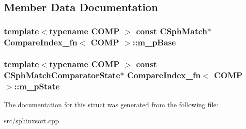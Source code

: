 \subsection{Member Data Documentation}
\hypertarget{structCompareIndex__fn_ac1ea399af8852b8bb036803a2cdeb092}{
\subsubsection[{m\-\_\-p\-Base}]{\setlength{\rightskip}{0pt plus 5cm}template$<$typename C\-O\-M\-P $>$ const {\bf C\-Sph\-Match}$\ast$ {\bf Compare\-Index\-\_\-fn}$<$ C\-O\-M\-P $>$\-::m\-\_\-p\-Base}}\label{structCompareIndex__fn_ac1ea399af8852b8bb036803a2cdeb092}
\hypertarget{structCompareIndex__fn_ae27e275ab3d168e613ded5ae1bfb55b6}{
\subsubsection[{m\-\_\-p\-State}]{\setlength{\rightskip}{0pt plus 5cm}template$<$typename C\-O\-M\-P $>$ const {\bf C\-Sph\-Match\-Comparator\-State}$\ast$ {\bf Compare\-Index\-\_\-fn}$<$ C\-O\-M\-P $>$\-::m\-\_\-p\-State}}\label{structCompareIndex__fn_ae27e275ab3d168e613ded5ae1bfb55b6}


The documentation for this struct was generated from the following file\-:\begin{DoxyCompactItemize}
\item 
src/\hyperlink{sphinxsort_8cpp}{sphinxsort.\-cpp}\end{DoxyCompactItemize}
